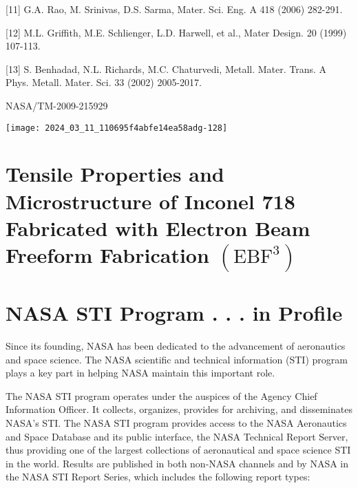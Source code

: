 \documentclass[10pt]{article}
\begin{document}
[11] G.A. Rao, M. Srinivas, D.S. Sarma, Mater. Sci. Eng. A 418 (2006) 282-291.

[12] M.L. Griffith, M.E. Schlienger, L.D. Harwell, et al., Mater Design. 20 (1999) 107-113.

[13] S. Benhadad, N.L. Richards, M.C. Chaturvedi, Metall. Mater. Trans. A Phys. Metall. Mater. Sci. 33 (2002) 2005-2017.

NASA/TM-2009-215929

\begin{center}
\texttt{[image: 2024\_03\_11\_110695f4abfe14ea58adg-128]}
\end{center}

\section*{Tensile Properties and Microstructure of Inconel 718 Fabricated with Electron Beam Freeform Fabrication $\left(\mathrm{EBF}^{3}\right)$ }


\section*{NASA STI Program . . . in Profile}
Since its founding, NASA has been dedicated to the advancement of aeronautics and space science. The NASA scientific and technical information (STI) program plays a key part in helping NASA maintain this important role.

The NASA STI program operates under the auspices of the Agency Chief Information Officer. It collects, organizes, provides for archiving, and disseminates NASA's STI. The NASA STI program provides access to the NASA Aeronautics and Space Database and its public interface, the NASA Technical Report Server, thus providing one of the largest collections of aeronautical and space science STI in the world. Results are published in both non-NASA channels and by NASA in the NASA STI Report Series, which includes the following report types:
\end{document}
